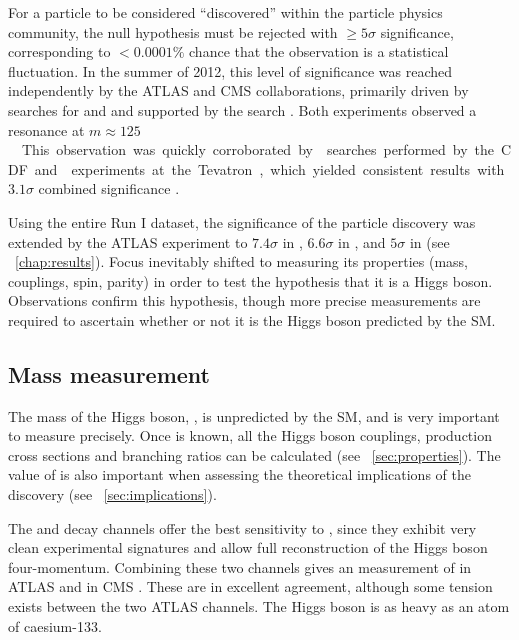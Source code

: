 
For a particle to be considered ``discovered'' within the particle physics community, 
the null hypothesis must be rejected with $\geq\!5\sigma$ significance, 
corresponding to $<0.0001\%$ chance that the observation is a statistical fluctuation.
In the summer of 2012, this level of significance was reached independently by the ATLAS 
and CMS collaborations, primarily driven by searches for \HepProcess{\PHiggs \HepTo 
\Pphoton\Pphoton} and \HepProcess{\PHiggs \HepTo \PZ\PZ} and supported by the \HWW search 
\cite{ATLAS-discovery,CMS-discovery}. Both experiments observed a resonance at 
\unit{$m \approx 125$}{\GeV}.

This observation was quickly corroborated by \HepProcess{\PV\PHiggs \HepTo 
\PV\Pbottom\APbottom} searches performed by the CDF and \dzero experiments at the Tevatron, 
which yielded consistent results with $3.1\sigma$ combined significance 
\cite{Tevatron:2012}.

Using the entire Run I dataset, the significance of the particle discovery was extended 
by the ATLAS experiment to $7.4\sigma$ in \HepProcess{\PHiggs \HepTo \Pphoton\Pphoton} 
\cite{ATLAS:combination:2013}, $6.6\sigma$ in \HepProcess{\PHiggs \HepTo \PZ\PZ} 
\cite{ATLAS:combination:2013}, and $5\sigma$ in \HWW (see 
\Chapter~\ref{chap:results}). Focus inevitably shifted to measuring its properties (mass, 
couplings, spin, parity) in order to test the hypothesis that it is a Higgs boson.
Observations confirm this hypothesis, though more precise measurements are required to 
ascertain whether or not it is the Higgs boson predicted by the SM.



\subsection{Mass measurement}
\label{sec:searches:mass}

The mass of the Higgs boson, \mH, is unpredicted by the SM, and is very important to 
measure precisely. Once \mH is known, all the Higgs boson couplings, production cross 
sections and branching ratios can be calculated (see \Section~\ref{sec:properties}). The 
value of \mH is also important when assessing the theoretical implications of the 
discovery (see \Section~\ref{sec:implications}).

The \HepProcess{\PHiggs \HepTo \Pphoton\Pphoton} and \HepProcess{\PHiggs \HepTo \PZ\PZ} 
decay channels offer the best sensitivity to \mH, since they exhibit very clean 
experimental signatures and allow full reconstruction of the Higgs boson four-momentum.
Combining these two channels gives an \mH measurement of 
\unit{}{\GeV} in ATLAS \cite{ATLAS:combination:2013} and 
\unit{}{\GeV} in CMS \cite{CMS:mass}. These are in excellent 
agreement, although some tension exists between the two ATLAS channels. The Higgs boson is 
as heavy as an atom of caesium-133.

